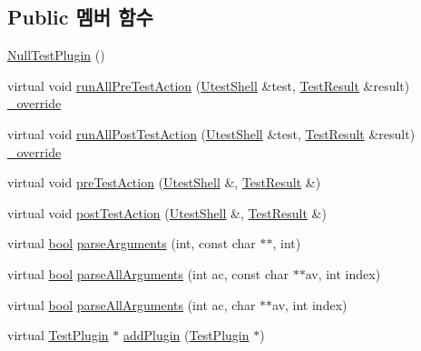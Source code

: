 \subsection*{Public 멤버 함수}
\begin{DoxyCompactItemize}
\item 
\hyperlink{class_null_test_plugin_af4cef21f095df8709dc263d3a2f264a4}{Null\+Test\+Plugin} ()
\item 
virtual void \hyperlink{class_null_test_plugin_ac0a34d45612b2e5e870bfe8d2929a75a}{run\+All\+Pre\+Test\+Action} (\hyperlink{class_utest_shell}{Utest\+Shell} \&test, \hyperlink{class_test_result}{Test\+Result} \&result) \hyperlink{_cpp_u_test_config_8h_a049bea15dd750e15869863c94c1efc3b}{\+\_\+override}
\item 
virtual void \hyperlink{class_null_test_plugin_ac05bc48cf47192517888cb6dbe38897d}{run\+All\+Post\+Test\+Action} (\hyperlink{class_utest_shell}{Utest\+Shell} \&test, \hyperlink{class_test_result}{Test\+Result} \&result) \hyperlink{_cpp_u_test_config_8h_a049bea15dd750e15869863c94c1efc3b}{\+\_\+override}
\item 
virtual void \hyperlink{class_test_plugin_aeb3d3b5a9cbcca6f8f4225bb29554ea2}{pre\+Test\+Action} (\hyperlink{class_utest_shell}{Utest\+Shell} \&, \hyperlink{class_test_result}{Test\+Result} \&)
\item 
virtual void \hyperlink{class_test_plugin_a4d9ea193c7b8e3eb8b50f985f688e4a8}{post\+Test\+Action} (\hyperlink{class_utest_shell}{Utest\+Shell} \&, \hyperlink{class_test_result}{Test\+Result} \&)
\item 
virtual \hyperlink{avb__gptp_8h_af6a258d8f3ee5206d682d799316314b1}{bool} \hyperlink{class_test_plugin_a167c2b07a0f83726bb9b1d1c0d741f88}{parse\+Arguments} (int, const char $\ast$$\ast$, int)
\item 
virtual \hyperlink{avb__gptp_8h_af6a258d8f3ee5206d682d799316314b1}{bool} \hyperlink{class_test_plugin_acfa2bcea2c98a16cb7d2a8f177bb84b9}{parse\+All\+Arguments} (int ac, const char $\ast$$\ast$av, int index)
\item 
virtual \hyperlink{avb__gptp_8h_af6a258d8f3ee5206d682d799316314b1}{bool} \hyperlink{class_test_plugin_a6d3fb0408bb544bd7ec5ba9300328a5e}{parse\+All\+Arguments} (int ac, char $\ast$$\ast$av, int index)
\item 
virtual \hyperlink{class_test_plugin}{Test\+Plugin} $\ast$ \hyperlink{class_test_plugin_ac63612b566d31b52b9c09e0552f8fe9b}{add\+Plugin} (\hyperlink{class_test_plugin}{Test\+Plugin} $\ast$)
\item 
$$
\end{DoxyCompactItemize}
